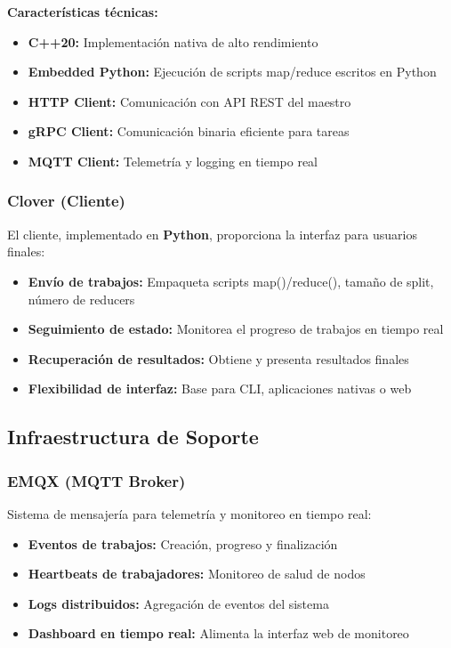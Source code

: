 \textbf{Características técnicas:}
\begin{itemize}
    \item \textbf{C++20:} Implementación nativa de alto rendimiento
    \item \textbf{Embedded Python:} Ejecución de scripts map/reduce escritos en Python
    \item \textbf{HTTP Client:} Comunicación con API REST del maestro
    \item \textbf{gRPC Client:} Comunicación binaria eficiente para tareas
    \item \textbf{MQTT Client:} Telemetría y logging en tiempo real
\end{itemize}

\subsubsection{Clover (Cliente)}

El cliente, implementado en \textbf{Python}, proporciona la interfaz para usuarios finales:

\begin{itemize}
    \item \textbf{Envío de trabajos:} Empaqueta scripts map()/reduce(), tamaño de split, número de reducers
    \item \textbf{Seguimiento de estado:} Monitorea el progreso de trabajos en tiempo real
    \item \textbf{Recuperación de resultados:} Obtiene y presenta resultados finales
    \item \textbf{Flexibilidad de interfaz:} Base para CLI, aplicaciones nativas o web
\end{itemize}

\subsection{Infraestructura de Soporte}

\subsubsection{EMQX (MQTT Broker)}

Sistema de mensajería para telemetría y monitoreo en tiempo real:

\begin{itemize}
    \item \textbf{Eventos de trabajos:} Creación, progreso y finalización
    \item \textbf{Heartbeats de trabajadores:} Monitoreo de salud de nodos
    \item \textbf{Logs distribuidos:} Agregación de eventos del sistema
    \item \textbf{Dashboard en tiempo real:} Alimenta la interfaz web de monitoreo
\end{itemize}

